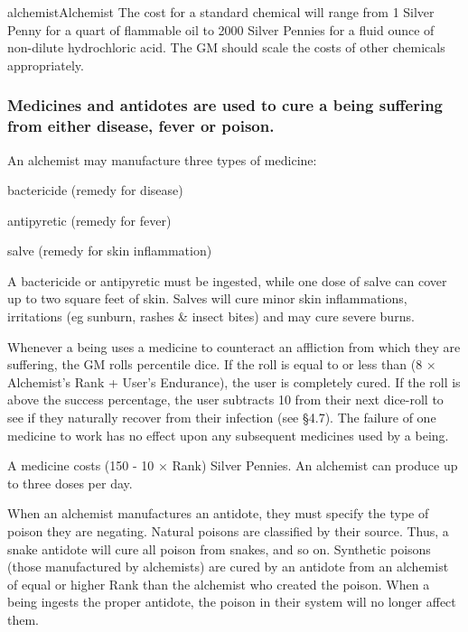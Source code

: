 \begin{Skill}[1.1]{alchemist}{Alchemist}
The cost for a standard chemical will range from 1 Silver Penny for a
quart of flammable oil to 2000 Silver Pennies for a fluid ounce of
non-dilute hydrochloric acid.  The GM should scale the costs of other
chemicals appropriately.

\subsubsection{Medicines and antidotes are used to cure a being suffering from either
disease, fever or poison.}

An alchemist may manufacture three types of medicine:

\begin{Itemize}

\item bactericide (remedy for disease)  

\item antipyretic (remedy for fever)  

\item salve (remedy for skin inflammation) 

\end{Itemize}

A bactericide or antipyretic must be ingested, while one dose of salve
can cover up to two square feet of skin. Salves will cure minor skin
inflammations, irritations (eg sunburn, rashes \& insect bites) and
may cure severe burns.

Whenever a being uses a medicine to counteract an affliction from
which they are suffering, the GM rolls percentile dice.  If the roll
is equal to or less than (8 × Alchemist’s Rank + User’s Endurance),
the user is completely cured. If the roll is above the success
percentage, the user subtracts 10 from their next dice-roll to see if
they naturally recover from their infection (see §4.7). The failure of
one medicine to work has no effect upon any subsequent medicines
used by a being.

A medicine costs (150 - 10 × Rank) Silver Pennies.  An alchemist can
produce up to three doses per day.

When an alchemist manufactures an antidote, they must specify the type
of poison they are negating.  Natural poisons are classified by their
source.  Thus, a snake antidote will cure all poison from snakes, and
so on. Synthetic poisons (those manufactured by alchemists) are cured
by an antidote from an alchemist of equal or higher Rank than the
alchemist who created the poison.  When a being ingests the proper
antidote, the poison in their system will no longer affect them.


\end{Skill}
